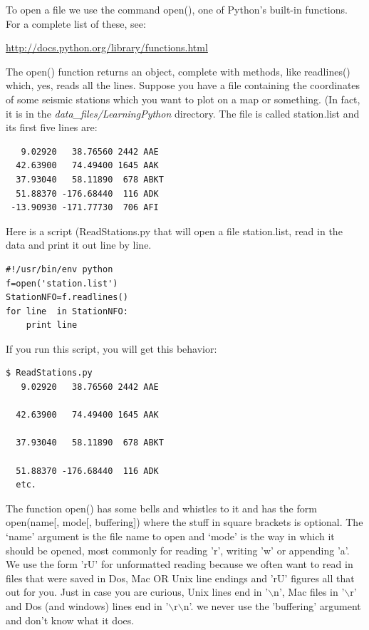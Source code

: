 \documentclass[11pt]{book}
\begin{document}
{{{{To open a file we use the command {\color{blue}open()}, one of Python's built-in functions.  For a complete list of these, see:

\url{http://docs.python.org/library/functions.html}

\noindent  The  {\color{blue}open()} function returns an object,  complete with methods, like {\color{blue}readlines()} which, yes, reads all the lines.   Suppose you have a file containing the coordinates of some
seismic stations which you want to plot on a map or something. (In fact, it is in the {\it data\_files/LearningPython} directory.   The file
is called {\color{blue}   station.list} and its first five lines are:

{\color{blue}\begin{verbatim}
   9.02920   38.76560 2442 AAE
  42.63900   74.49400 1645 AAK
  37.93040   58.11890  678 ABKT
  51.88370 -176.68440  116 ADK
 -13.90930 -171.77730  706 AFI
 \end{verbatim}}
Here is a script ({\color{blue}ReadStations.py} that will open a file  {\color{blue}station.list}, read in the data and print it out line by line.
{ \color{blue} \begin{verbatim}
#!/usr/bin/env python
f=open('station.list')
StationNFO=f.readlines()
for line  in StationNFO:
    print line
\end{verbatim}}

If you run this script, you will get this behavior:
{ \color{blue} \begin{verbatim}
$ ReadStations.py
   9.02920   38.76560 2442 AAE

  42.63900   74.49400 1645 AAK

  37.93040   58.11890  678 ABKT

  51.88370 -176.68440  116 ADK
  etc.
  \end{verbatim}}

\noindent The function  {\color{blue}open()} has some bells and whistles to it and has the form  {\color{blue}open(name[, mode[, buffering])} where the stuff in square brackets is optional.  The `name' argument is the file name to open and `mode' is the way in which it should be opened, most commonly for reading 'r', writing 'w' or appending 'a'. We use the form 'rU' for unformatted reading because we often want to read in files that were saved in Dos, Mac OR Unix line endings and 'rU' figures all that out for you.  Just in case you are curious, Unix lines end in '$\backslash$n',  Mac files in '$\backslash$r' and Dos (and windows) lines end in '$\backslash$r$\backslash$n'.    we never use the 'buffering' argument and don't know what it does.

}}}}
\end{document}

